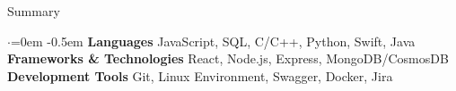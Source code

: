 \documentclass{resume} %
\begin{document}
\vspace{-0.5em}
\begin{rSection}{Summary}
  \vspace{0.5em}
  \begin{list}{$\cdot$}{\leftmargin=0em}
    \itemsep -0.5em \vspace{-0.5em}
      {\bf Languages} \hspace{120pt} JavaScript, SQL, C/C++, Python, Swift, Java  \\
      {\bf Frameworks \& Technologies} \hspace{16pt} React, Node.js, Express, MongoDB/CosmosDB\\
      {\bf Development Tools} \hspace{67pt} Git, Linux Environment, Swagger, Docker, Jira \\
  \end{list}
  \vspace{-1em}
\end{rSection}

\end{document}
